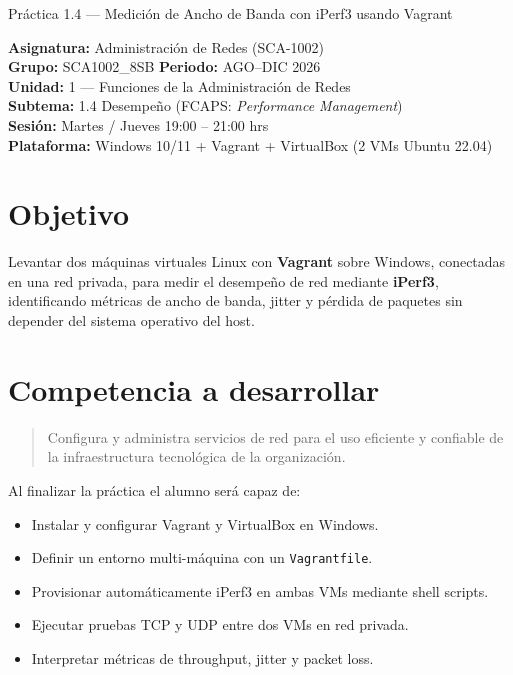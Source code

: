 \documentclass[12pt]{article}
\begin{document}
\begin{center}
{\LARGE Práctica 1.4 --- Medición de Ancho de Banda con iPerf3 usando Vagrant}
\end{center}

\noindent\textbf{Asignatura:} Administración de Redes (SCA-1002) \\
\textbf{Grupo:} SCA1002\_8SB \quad \textbf{Periodo:} AGO--DIC 2026 \\
\textbf{Unidad:} 1 --- Funciones de la Administración de Redes \\
\textbf{Subtema:} 1.4 Desempeño (FCAPS: \emph{Performance Management}) \\
\textbf{Sesión:} Martes / Jueves 19:00 -- 21:00 hrs \\
\textbf{Plataforma:} Windows 10/11 + Vagrant + VirtualBox (2 VMs Ubuntu 22.04)

\section{Objetivo}

Levantar dos máquinas virtuales Linux con \textbf{Vagrant} sobre Windows, conectadas en una red privada, para medir el desempeño de red mediante \textbf{iPerf3}, identificando métricas de ancho de banda, jitter y pérdida de paquetes sin depender del sistema operativo del host.

\section{Competencia a desarrollar}

\begin{quote}
Configura y administra servicios de red para el uso eficiente y confiable de la infraestructura tecnológica de la organización.
\end{quote}

Al finalizar la práctica el alumno será capaz de:

\begin{itemize}
	\item Instalar y configurar Vagrant y VirtualBox en Windows.
	\item Definir un entorno multi-máquina con un \texttt{Vagrantfile}.
	\item Provisionar automáticamente iPerf3 en ambas VMs mediante shell scripts.
	\item Ejecutar pruebas TCP y UDP entre dos VMs en red privada.
	\item Interpretar métricas de throughput, jitter y packet loss.
\end{itemize}
\end{document}

